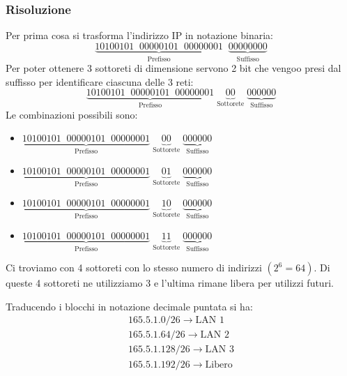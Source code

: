\documentclass[a4paper]{article}
\begin{document}
\subsubsection{Risoluzione}
Per prima cosa si trasforma l'indirizzo IP in notazione binaria:
\[
  \underbrace{1010 0101 \;\; 0000 0101 \;\; 0000 0001}_{\text{Prefisso}} \;\;
  \underbrace{0000 0000}_{\text{Suffisso}}
\] 
Per poter ottenere 3 sottoreti di dimensione servono 2 bit che vengoo presi dal suffisso
per identificare ciascuna delle 3 reti:
\[
  \underbrace{1010 0101 \;\; 0000 0101 \;\; 0000 0001}_{\text{Prefisso}} \;
  \underbrace{00}_{\text{Sottorete}} \;
  \underbrace{00 0000}_{\text{Suffisso}}
\] 
Le combinazioni possibili sono:
\begin{itemize}
  \item 
    \(
    \underbrace{1010 0101 \;\; 0000 0101 \;\; 0000 0001}_{\text{Prefisso}} \;
    \underbrace{00}_{\text{Sottorete}} \;
    \underbrace{00 0000}_{\text{Suffisso}}
    \) 

  \item 
    \(
    \underbrace{1010 0101 \;\; 0000 0101 \;\; 0000 0001}_{\text{Prefisso}} \;
    \underbrace{01}_{\text{Sottorete}} \;
    \underbrace{00 0000}_{\text{Suffisso}}
    \) 

  \item 
    \(
    \underbrace{1010 0101 \;\; 0000 0101 \;\; 0000 0001}_{\text{Prefisso}} \;
    \underbrace{10}_{\text{Sottorete}} \;
    \underbrace{00 0000}_{\text{Suffisso}}
    \) 

  \item 
    \(
    \underbrace{1010 0101 \;\; 0000 0101 \;\; 0000 0001}_{\text{Prefisso}} \;
    \underbrace{11}_{\text{Sottorete}} \;
    \underbrace{00 0000}_{\text{Suffisso}}
    \) 
\end{itemize}
Ci troviamo con 4 sottoreti con lo stesso numero di indirizzi \( \left( 2^6 = 64 \right) \).
Di queste 4 sottoreti ne utilizziamo 3 e l'ultima rimane libera per utilizzi futuri.

\vspace{1em}
\noindent
Traducendo i blocchi in notazione decimale puntata si ha:
\[
  \begin{aligned}
    165.5.1.0/26 \to \text{LAN 1}\\
    165.5.1.64/26 \to \text{LAN 2}\\
    165.5.1.128/26 \to \text{LAN 3}\\
    165.5.1.192/26 \to \text{Libero}
  \end{aligned}
\] 
\end{document}
